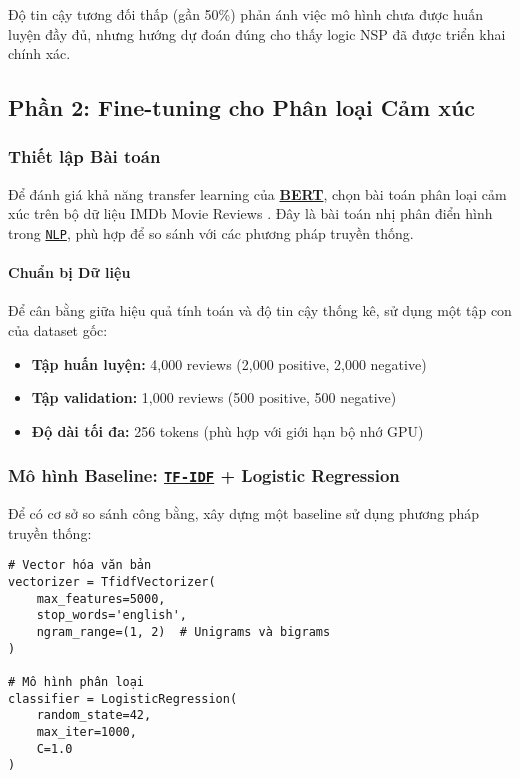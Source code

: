 Độ tin cậy tương đối thấp (gần 50\%) phản ánh việc mô hình chưa được huấn luyện đầy đủ, nhưng hướng dự đoán đúng cho thấy logic NSP đã được triển khai chính xác.

\subsection{Phần 2: Fine-tuning cho Phân loại Cảm xúc}
\label{ssec:fine_tuning_sentiment}

\subsubsection{Thiết lập Bài toán}

Để đánh giá khả năng transfer learning của \hyperref[acro:bert]{\textbf{BERT}}, chọn bài toán phân loại cảm xúc trên bộ dữ liệu IMDb Movie Reviews \cite{maas2011learning}. Đây là bài toán nhị phân điển hình trong \hyperref[acro:nlp]{\texttt{NLP}}, phù hợp để so sánh với các phương pháp truyền thống.

\paragraph{Chuẩn bị Dữ liệu}
Để cân bằng giữa hiệu quả tính toán và độ tin cậy thống kê, sử dụng một tập con của dataset gốc:

\begin{itemize}
    \item \textbf{Tập huấn luyện:} 4,000 reviews (2,000 positive, 2,000 negative)
    \item \textbf{Tập validation:} 1,000 reviews (500 positive, 500 negative)
    \item \textbf{Độ dài tối đa:} 256 tokens (phù hợp với giới hạn bộ nhớ GPU)
\end{itemize}

\subsubsection{Mô hình Baseline: \hyperref[acro:tfidf]{\texttt{TF-IDF}} + Logistic Regression}

Để có cơ sở so sánh công bằng, xây dựng một baseline sử dụng phương pháp truyền thống:

\begin{verbatim}
# Vector hóa văn bản
vectorizer = TfidfVectorizer(
    max_features=5000,
    stop_words='english',
    ngram_range=(1, 2)  # Unigrams và bigrams
)

# Mô hình phân loại
classifier = LogisticRegression(
    random_state=42,
    max_iter=1000,
    C=1.0
)
\end{verbatim}

